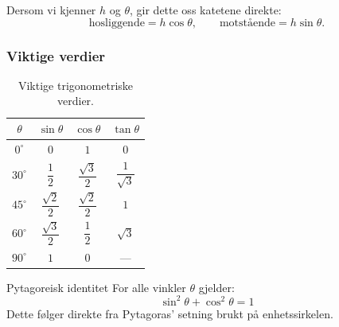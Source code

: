 Dersom vi kjenner $h$ og $\theta$, gir dette oss katetene direkte:
\[
\text{hosliggende} = h\cos\theta, \qquad \text{motstående} = h\sin\theta.
\]

\subsubsection*{Viktige verdier}

\begin{table}[H]
\centering
\renewcommand{\arraystretch}{1.55}
\begin{tabular}{|c|c|c|c|}
\hline
\rowcolor{blue!20!black!10}
$\theta$ & $\sin\theta$ & $\cos\theta$ & $\tan\theta$ \\
\hline
$0^\circ$  & $0$ & $1$ & $0$ \\
\hline
$30^\circ$ & $\dfrac{1}{2}$ & $\dfrac{\sqrt{3}}{2}$ & $\dfrac{1}{\sqrt{3}}$ \\
\hline
$45^\circ$ & $\dfrac{\sqrt{2}}{2}$ & $\dfrac{\sqrt{2}}{2}$ & $1$ \\
\hline
$60^\circ$ & $\dfrac{\sqrt{3}}{2}$ & $\dfrac{1}{2}$ & $\sqrt{3}$ \\
\hline
$90^\circ$ & $1$ & $0$ & — \\
\hline
\end{tabular}
\caption{Viktige trigonometriske verdier.}
\label{tab:trig}
\end{table}

\begin{myoppsum*}{Pytagoreisk identitet}
For alle vinkler $\theta$ gjelder:
\[
\sin^2\theta + \cos^2\theta = 1
\]
Dette følger direkte fra Pytagoras' setning brukt på enhetssirkelen.
\end{myoppsum*}


